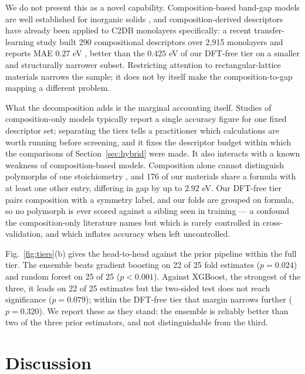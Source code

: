 \documentclass{ieeeaccess}
\begin{document}
We do not present this as a novel capability. Composition-based band-gap models are well established for inorganic solids \cite{zhuo2018predicting,gomes2021utility,wang2024gbdt}, and composition-derived descriptors have already been applied to C2DB monolayers specifically: a recent transfer-learning study built 290 compositional descriptors over 2{,}915 monolayers and reports MAE $0.27$ eV \cite{transfer2025monolayer}, better than the $0.425$ eV of our DFT-free tier on a smaller and structurally narrower subset. Restricting attention to rectangular-lattice materials narrows the sample; it does not by itself make the composition-to-gap mapping a different problem.

What the decomposition adds is the marginal accounting itself. Studies of composition-only models typically report a single accuracy figure for one fixed descriptor set; separating the tiers tells a practitioner which calculations are worth running before screening, and it fixes the descriptor budget within which the comparisons of Section~\ref{sec:hybrid} were made. It also interacts with a known weakness of composition-based models. Composition alone cannot distinguish polymorphs of one stoichiometry \cite{gomes2021utility}, and 176 of our materials share a formula with at least one other entry, differing in gap by up to $2.92$ eV. Our DFT-free tier pairs composition with a symmetry label, and our folds are grouped on formula, so no polymorph is ever scored against a sibling seen in training --- a confound the composition-only literature names but which is rarely controlled in cross-validation, and which inflates accuracy when left uncontrolled.

Fig.~\ref{fig:tiers}(b) gives the head-to-head against the prior pipeline within the full tier. The ensemble beats gradient boosting on 22 of 25 fold estimates ($p = 0.024$) and random forest on 25 of 25 ($p < 0.001$). Against XGBoost, the strongest of the three, it leads on 22 of 25 estimates but the two-sided test does not reach significance ($p = 0.079$); within the DFT-free tier that margin narrows further ($p = 0.320$). We report these as they stand: the ensemble is reliably better than two of the three prior estimators, and not distinguishable from the third.

\section{Discussion}
\label{sec:discussion}
\end{document}
